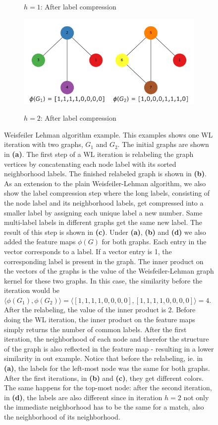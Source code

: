 \begin{figure}[htb!]
\begin{subfigure}[t]{0.49\linewidth}
  \caption{$h=1$: After label compression}
  \end{subfigure}
\begin{subfigure}[t]{0.49\linewidth}
{\includegraphics[width=\linewidth]{assets/figures/wl_examples/wl_iteration_2_stage_1_compressed.pdf}\label{fig:wl_example_2}}
\caption{$h=2$: After label compression}
\end{subfigure}
  \caption[Example: Weisfeiler Lehman iteration]{Weisfeiler Lehman algorithm example. This examples shows one WL iteration with two graphs, $G_1$ and $G_2$. The initial graphs are shown in \textbf{(a)}. The first step of a WL iteration is relabeling the graph vertices by concatenating each node label with its sorted neighborhood labels. The finished relabeled graph is shown in \textbf{(b)}. As an extension to the plain Weisfeiler-Lehman algorithm, we also show the label compression step where the long labels, consisting of the node label and its neighborhood labels, get compressed into a smaller label by assigning each unique label a new number. Same multi-label labels in different graphs get the same new label. The result of this step is shown in \textbf{(c)}. Under \textbf{(a)},  \textbf{(b)} and \textbf{(d)} we also added the feature maps $\phi(G)$ for both graphs. Each entry in the vector corresponds to a label. If a vector entry is 1, the corresponding label is present in the graph. The inner product on the vectors of the graphs is the value of the Weisfeiler-Lehman graph kernel for these two graphs.
  In this case, the similarity before the iteration would be $\langle \phi(G_1), \phi(G_2) \rangle = \langle [1, 1, 1, 1, 0, 0, 0, 0], [1, 1, 1, 1, 0, 0, 0, 0] \rangle = 4$. After the relabeling, the value of the inner product is $2$.
  Before doing the WL iteration, the inner product on the feature maps simply returns the number of common labels. After the first iteration, the neighborhood of each node and therefor the structure of the graph is also reflected in the feature map - resulting in a lower similarity in out example.
  Notice that before the relabeling, ie. in \textbf{(a)}, the labels for the left-most node was the same for both graphs. After the first iterations, in \textbf{(b)} and \textbf{(c)}, they get different colors.
  The same happens for the top-most node: after the second iteration, in \textbf{(d)}, the labels are also different since in iteration $h=2$ not only the immediate neighborhood has to be the same for a match, also the neighborhood of its neighborhood.}\label{fig:wl_example}
\end{figure}

